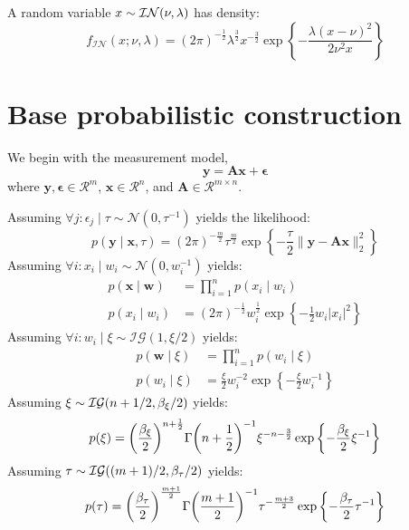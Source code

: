 \documentclass{article}
\numberwithin{equation}{section}
\newcommand{\lh}{\mathopen{}\mathclose\bgroup\left}
\newcommand{\rh}{\aftergroup\egroup\right}
\newcommand{\m}[1]{\boldsymbol{#1}}
\newcommand{\INDist}[2]{\mathcal{IN}\lh( #1, #2 \rh)}
\newcommand{\setR}{\mathcal{R}}
\begin{document}
A random variable $x \sim \INDist{\nu}{\lambda}$ has density:
\begin{equation*}
f_{\mathcal{IN}}(x; \nu, \lambda) =
 (2 \pi)^{-\frac{1}{2}}
 \lambda^{\frac{3}{2}}
 x^{-\frac{3}{2}}
 \exp\left\{
  -\frac{\lambda (x - \nu)^2}{2 \nu^2 x}
 \right\}
\end{equation*}

\clearpage
\section{Base probabilistic construction}
\label{s:const}
We begin with the measurement model,
\begin{equation}
\m{y} = \m{A} \m{x} + \m{\epsilon}
\end{equation}
where $\m{y}, \m{\epsilon} \in \setR^m$, $\m{x} \in \setR^n$, and
$\m{A} \in \setR^{m \times n}$.

Assuming $\forall j: \epsilon_j \mid \tau \sim \mathcal{N}(0, \tau^{-1})$
yields the likelihood:
\begin{equation}
p(\m{y} \mid \m{x}, \tau) =
 (2 \pi)^{-\frac{m}{2}} \tau^{\frac{m}{2}}
 \exp\left\{
  -\frac{\tau}{2} \| \m{y} - \m{A} \m{x} \|_2^2
 \right\}
\end{equation}
Assuming $\forall i: x_i \mid w_i \sim \mathcal{N}(0, w_i^{-1})$
yields:
\begin{equation}
\begin{aligned}
p(\m{x} \mid \m{w}) &= \prod_{i=1}^n p(x_i \mid w_i)
\\
p(x_i \mid w_i) &=
 (2 \pi)^{-\frac{1}{2}} w_i^{\frac{1}{2}}
 \exp\left\{
  -\frac{1}{2} w_i |x_i|^2
 \right\}
\end{aligned}
\end{equation}
Assuming $\forall i: w_i \mid \xi \sim \mathcal{IG}(1, \xi/2)$
yields:
\begin{equation}
\begin{aligned}
p(\m{w} \mid \xi) &= \prod_{i=1}^n p(w_i \mid \xi)
\\
p(w_i \mid \xi) &=
 \frac{\xi}{2} w_i^{-2}
 \exp\left\{ -\frac{\xi}{2} w_i^{-1} \right\}
\end{aligned}
\end{equation}
Assuming $\xi \sim \mathcal{IG}\lh(n+1/2, \beta_\xi/2\rh)$
yields:
\begin{equation}
p(\xi) =
 \lh(\frac{\beta_\xi}{2}\rh)^{n+\frac{1}{2}}
 \Gamma\lh(n+\frac{1}{2}\rh)^{-1}
 \xi^{-n-\frac{3}{2}}
 \exp\left\{ -\frac{\beta_\xi}{2} \xi^{-1} \right\}
\end{equation}
Assuming $\tau \sim \mathcal{IG}\lh((m+1)/2, \beta_\tau/2\rh)$
yields:
\begin{equation}
p(\tau) =
 \lh(\frac{\beta_\tau}{2}\rh)^{\frac{m+1}{2}}
 \Gamma\lh(\frac{m+1}{2}\rh)^{-1}
 \tau^{-\frac{m+3}{2}}
 \exp\left\{ -\frac{\beta_\tau}{2} \tau^{-1} \right\}
\end{equation}
\end{document}

